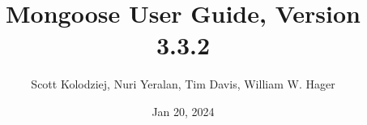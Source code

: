 \title{Mongoose User Guide, Version 3.3.2}
\author{Scott Kolodziej, Nuri Yeralan, Tim Davis, William W. Hager}
\date{Jan 20, 2024}

